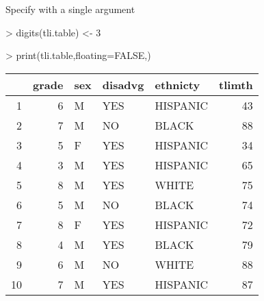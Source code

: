 \documentclass[letterpaper]{article}
\begin{document}
Specify with a single argument
\begin{Schunk}
\begin{Sinput}
> digits(tli.table) <- 3
\end{Sinput}
\end{Schunk}
\begin{Schunk}
\begin{Sinput}
> print(tli.table,floating=FALSE,)
\end{Sinput}
% latex table generated in R 3.1.1 by xtable 1.7-3 package
% 
\begin{tabular}{|rr|lp{3cm}l|r|}
  \hline
 & grade & sex & disadvg & ethnicty & tlimth \\ 
  \hline
1 &    6 & M & YES & HISPANIC &   43 \\ 
  2 &    7 & M & NO & BLACK &   88 \\ 
  3 &    5 & F & YES & HISPANIC &   34 \\ 
  4 &    3 & M & YES & HISPANIC &   65 \\ 
  5 &    8 & M & YES & WHITE &   75 \\ 
  6 &    5 & M & NO & BLACK &   74 \\ 
  7 &    8 & F & YES & HISPANIC &   72 \\ 
  8 &    4 & M & YES & BLACK &   79 \\ 
  9 &    6 & M & NO & WHITE &   88 \\ 
  10 &    7 & M & YES & HISPANIC &   87 \\ 
   \hline
\end{tabular}\end{Schunk}
\end{document}

